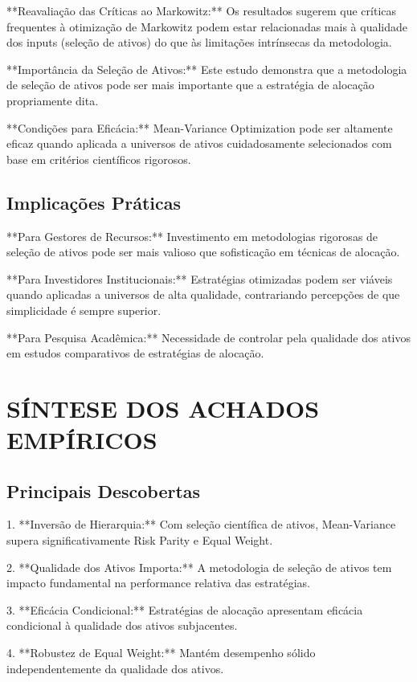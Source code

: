 **Reavaliação das Críticas ao Markowitz:** Os resultados sugerem que críticas frequentes à otimização de Markowitz podem estar relacionadas mais à qualidade dos inputs (seleção de ativos) do que às limitações intrínsecas da metodologia.

**Importância da Seleção de Ativos:** Este estudo demonstra que a metodologia de seleção de ativos pode ser mais importante que a estratégia de alocação propriamente dita.

**Condições para Eficácia:** Mean-Variance Optimization pode ser altamente eficaz quando aplicada a universos de ativos cuidadosamente selecionados com base em critérios científicos rigorosos.

\subsection{Implicações Práticas}

**Para Gestores de Recursos:** Investimento em metodologias rigorosas de seleção de ativos pode ser mais valioso que sofisticação em técnicas de alocação.

**Para Investidores Institucionais:** Estratégias otimizadas podem ser viáveis quando aplicadas a universos de alta qualidade, contrariando percepções de que simplicidade é sempre superior.

**Para Pesquisa Acadêmica:** Necessidade de controlar pela qualidade dos ativos em estudos comparativos de estratégias de alocação.

\section{SÍNTESE DOS ACHADOS EMPÍRICOS}

\subsection{Principais Descobertas}

1. **Inversão de Hierarquia:** Com seleção científica de ativos, Mean-Variance supera significativamente Risk Parity e Equal Weight.

2. **Qualidade dos Ativos Importa:** A metodologia de seleção de ativos tem impacto fundamental na performance relativa das estratégias.

3. **Eficácia Condicional:** Estratégias de alocação apresentam eficácia condicional à qualidade dos ativos subjacentes.

4. **Robustez de Equal Weight:** Mantém desempenho sólido independentemente da qualidade dos ativos.

